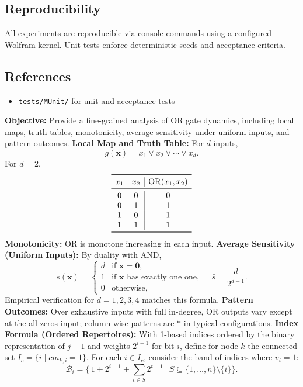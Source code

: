 \subsection{Reproducibility}
All experiments are reproducible via console commands using a configured Wolfram kernel. Unit tests enforce deterministic seeds and acceptance criteria.
\subsection{References}
\begin{itemize}
\item \texttt{tests/MUnit/} for unit and acceptance tests
\end{itemize}



\textbf{Objective:} Provide a fine-grained analysis of OR gate dynamics, including local maps, truth tables, monotonicity, average sensitivity under uniform inputs, and pattern outcomes.
\textbf{Local Map and Truth Table:} For \(d\) inputs,
\[
g(\mathbf{x}) = x_1 \lor x_2 \lor \cdots \lor x_d.
\]
For \(d=2\),
\[
\begin{array}{cc|c}
\toprule
 x_1 & x_2 & \mathrm{OR}(x_1,x_2) \\
\midrule
 0 & 0 & 0 \\
 0 & 1 & 1 \\
 1 & 0 & 1 \\
 1 & 1 & 1 \\
\bottomrule
\end{array}
\]
\textbf{Monotonicity:} OR is monotone increasing in each input.
\textbf{Average Sensitivity (Uniform Inputs):} By duality with AND,
\[
s(\mathbf{x}) = \begin{cases}
 d & \text{if } \mathbf{x}=\mathbf{0},\\
 1 & \text{if } \mathbf{x} \text{ has exactly one one},\\
 0 & \text{otherwise,}
\end{cases}\quad \bar{s} = \frac{d}{2^{d-1}}.
\]
Empirical verification for \(d=1,2,3,4\) matches this formula.
\textbf{Pattern Outcomes:} Over exhaustive inputs with full in-degree, OR outputs vary except at the all-zeros input; column-wise patterns are \(*\) in typical configurations.
\textbf{Index Formula (Ordered Repertoires):} With 1-based indices ordered by the binary representation of \(j-1\) and weights \(2^{i-1}\) for bit \(i\), define for node \(k\) the connected set \(I_c=\{i\mid cm_{k,i}=1\}\). For each \(i\in I_c\), consider the band of indices where \(v_i=1\):
\[
\mathcal{B}_i=\Big\{\,1+2^{i-1}+\sum_{t\in S}2^{t-1}\ \Big|\ S\subseteq\{1,\dots,n\}\setminus\{i\}\Big\}.
\]
